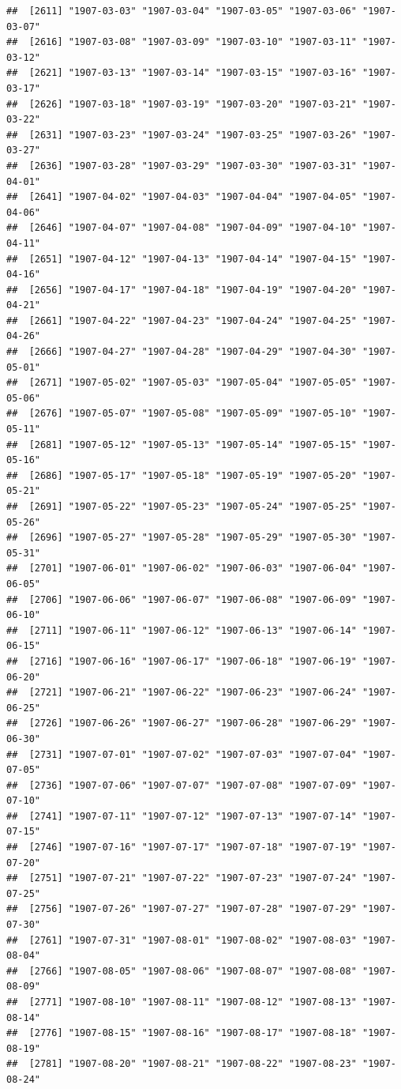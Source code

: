 \documentclass{article}\usepackage[]{graphicx}\usepackage[]{color}
\makeatletter
\newenvironment{kframe}{%
 \def\at@end@of@kframe{}%
 \ifinner\ifhmode%
  \def\at@end@of@kframe{\end{minipage}}%
  \begin{minipage}{\columnwidth}%
 \fi\fi%
 \def\FrameCommand##1{\hskip\@totalleftmargin \hskip-\fboxsep
 \colorbox{shadecolor}{##1}\hskip-\fboxsep
     \hskip-\linewidth \hskip-\@totalleftmargin \hskip\columnwidth}%
 \MakeFramed {\advance\hsize-\width
   \@totalleftmargin\z@ \linewidth\hsize
   \@setminipage}}%
 {\par\unskip\endMakeFramed%
 \at@end@of@kframe}
\newenvironment{knitrout}{}{} %
\makeatother
\begin{document}
\begin{description}
\begin{knitrout}
\begin{kframe}
\begin{verbatim}
##  [2611] "1907-03-03" "1907-03-04" "1907-03-05" "1907-03-06" "1907-03-07"
##  [2616] "1907-03-08" "1907-03-09" "1907-03-10" "1907-03-11" "1907-03-12"
##  [2621] "1907-03-13" "1907-03-14" "1907-03-15" "1907-03-16" "1907-03-17"
##  [2626] "1907-03-18" "1907-03-19" "1907-03-20" "1907-03-21" "1907-03-22"
##  [2631] "1907-03-23" "1907-03-24" "1907-03-25" "1907-03-26" "1907-03-27"
##  [2636] "1907-03-28" "1907-03-29" "1907-03-30" "1907-03-31" "1907-04-01"
##  [2641] "1907-04-02" "1907-04-03" "1907-04-04" "1907-04-05" "1907-04-06"
##  [2646] "1907-04-07" "1907-04-08" "1907-04-09" "1907-04-10" "1907-04-11"
##  [2651] "1907-04-12" "1907-04-13" "1907-04-14" "1907-04-15" "1907-04-16"
##  [2656] "1907-04-17" "1907-04-18" "1907-04-19" "1907-04-20" "1907-04-21"
##  [2661] "1907-04-22" "1907-04-23" "1907-04-24" "1907-04-25" "1907-04-26"
##  [2666] "1907-04-27" "1907-04-28" "1907-04-29" "1907-04-30" "1907-05-01"
##  [2671] "1907-05-02" "1907-05-03" "1907-05-04" "1907-05-05" "1907-05-06"
##  [2676] "1907-05-07" "1907-05-08" "1907-05-09" "1907-05-10" "1907-05-11"
##  [2681] "1907-05-12" "1907-05-13" "1907-05-14" "1907-05-15" "1907-05-16"
##  [2686] "1907-05-17" "1907-05-18" "1907-05-19" "1907-05-20" "1907-05-21"
##  [2691] "1907-05-22" "1907-05-23" "1907-05-24" "1907-05-25" "1907-05-26"
##  [2696] "1907-05-27" "1907-05-28" "1907-05-29" "1907-05-30" "1907-05-31"
##  [2701] "1907-06-01" "1907-06-02" "1907-06-03" "1907-06-04" "1907-06-05"
##  [2706] "1907-06-06" "1907-06-07" "1907-06-08" "1907-06-09" "1907-06-10"
##  [2711] "1907-06-11" "1907-06-12" "1907-06-13" "1907-06-14" "1907-06-15"
##  [2716] "1907-06-16" "1907-06-17" "1907-06-18" "1907-06-19" "1907-06-20"
##  [2721] "1907-06-21" "1907-06-22" "1907-06-23" "1907-06-24" "1907-06-25"
##  [2726] "1907-06-26" "1907-06-27" "1907-06-28" "1907-06-29" "1907-06-30"
##  [2731] "1907-07-01" "1907-07-02" "1907-07-03" "1907-07-04" "1907-07-05"
##  [2736] "1907-07-06" "1907-07-07" "1907-07-08" "1907-07-09" "1907-07-10"
##  [2741] "1907-07-11" "1907-07-12" "1907-07-13" "1907-07-14" "1907-07-15"
##  [2746] "1907-07-16" "1907-07-17" "1907-07-18" "1907-07-19" "1907-07-20"
##  [2751] "1907-07-21" "1907-07-22" "1907-07-23" "1907-07-24" "1907-07-25"
##  [2756] "1907-07-26" "1907-07-27" "1907-07-28" "1907-07-29" "1907-07-30"
##  [2761] "1907-07-31" "1907-08-01" "1907-08-02" "1907-08-03" "1907-08-04"
##  [2766] "1907-08-05" "1907-08-06" "1907-08-07" "1907-08-08" "1907-08-09"
##  [2771] "1907-08-10" "1907-08-11" "1907-08-12" "1907-08-13" "1907-08-14"
##  [2776] "1907-08-15" "1907-08-16" "1907-08-17" "1907-08-18" "1907-08-19"
##  [2781] "1907-08-20" "1907-08-21" "1907-08-22" "1907-08-23" "1907-08-24"

\end{verbatim}
\end{kframe}
\end{knitrout}
\end{description}
\end{document}
